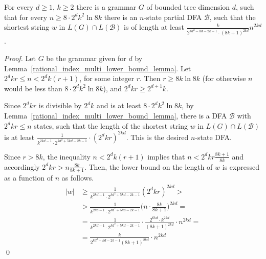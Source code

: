 \documentclass[runningheads]{llncs}
\newcommand{\ifdraft}[1]{#1}
\newcommand{\es}[1]{\ifdraft{\noindent\colorbox{lavender}{E.S.: #1}}}
\begin{document}
\begin{theorem}\label{rational_index_multi_lower_bound_theorem}
For every $d \geqslant 1$, $k \geqslant 2$
there is a grammar $G$ of bounded tree dimension $d$,
such that for every $n \geqslant 8 \cdot 2^d k^2 \ln 8k$
there is an $n$-state partial DFA $\mathcal{B}$,
such that the shortest string $w$ in $L(G) \cap L(\mathcal{B})$
is of length at least
$\frac{k}{2^{kd^2 - kd -2k -1} \cdot (8k+1)^{2kd}} n^{2kd}$.
\end{theorem}
\begin{proof}
Let $G$ be the grammar given for $d$ by Lemma~\ref{rational_index_multi_lower_bound_lemma}.
Let $2^d k r \leqslant n < 2^d k (r+1)$, for some integer $r$.
Then $r \geqslant 8k \ln 8k$
(for otherwise $n$ would be less than $8 \cdot 2^d k^2 \ln 8k$),
and $2^d k r \geqslant 2^{d+1} k$.

Since $2^d k r$ is divisible by $2^dk$
and is at least $8 \cdot 2^d k^2 \ln 8k$,
by Lemma~\ref{rational_index_multi_lower_bound_lemma},
there is a DFA $\mathcal{B}$ with $2^d k r \leqslant n$ states,
such that the length of the shortest string $w$ in $L(G) \cap L(\mathcal{B})$
is at least $\frac{1}{k^{2kd-1} \cdot 2^{kd^2 + 5kd -2k -1}} \cdot (2^d k r)^{2kd}$.
This is the desired $n$-state DFA.


Since $r > 8k$,
the inequality $n < 2^d k (r+1)$ implies that
$n < 2^d k r \frac{8k+1}{8k}$
and accordingly $2^d k r > n \frac{8k}{8k+1}$.
Then, the lower bound on the length of $w$
is expressed as a function of $n$ as follows.
\begin{align*}
	|w|
		&\geqslant 
	\frac{1}{k^{2kd-1} \cdot 2^{kd^2 + 5kd -2k -1}} (2^d k r)^{2kd}
		> \\ &>
	\frac{1}{k^{2kd-1} \cdot 2^{kd^2 + 5kd -2k -1}} \Big(n \cdot \frac{8k}{8k+1}\Big)^{2kd}
		= \\ &=
	\frac{1}{k^{2kd-1} \cdot 2^{kd^2 + 5kd -2k -1}} \cdot \frac{2^{6kd} \cdot k^{2kd}}{(8k+1)^{2kd}} \cdot n^{2kd}
		= \\ &=
	\frac{k}{2^{kd^2 - kd - 2k - 1} (8k+1)^{2kd}} \cdot n^{2kd}
\end{align*}
\qed
\end{proof}
\end{document}
